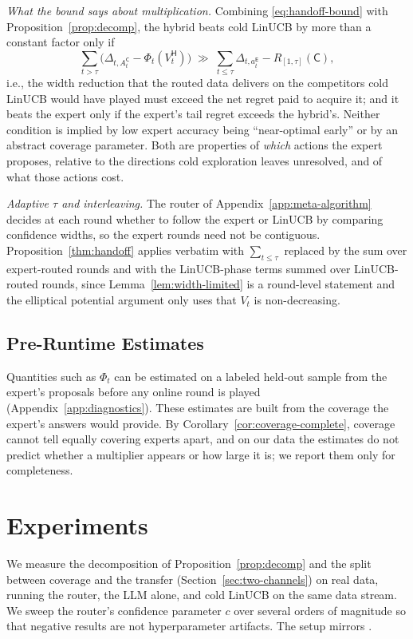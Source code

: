 \documentclass{article}
\theoremstyle{definition}
\theoremstyle{remark}
\theoremstyle{remark}
\newcommand{\Cold}{\mathsf{C}}
\newcommand{\Exp}{\mathsf{E}}
\newcommand{\Hyb}{\mathsf{H}}
\begin{document}
\emph{What the bound says about multiplication.} Combining
\eqref{eq:handoff-bound} with Proposition~\ref{prop:decomp}, the hybrid beats
cold LinUCB by more than a constant factor only if
\[
\sum_{t>\tau}\bigl(\Delta_{t,A^{\Cold}_t}-\Phi_t(V^{\Hyb}_t)\bigr)
\;\gg\;
\sum_{t\le\tau}\Delta_{t,a_t^{\Exp}}-R_{[1,\tau]}(\Cold),
\]
i.e., the width reduction that the routed data delivers on the competitors
cold LinUCB would have played must exceed the net regret paid to acquire it;
and it beats the expert only if the expert's tail regret exceeds the hybrid's.
Neither condition is implied by low expert accuracy being ``near-optimal
early'' or by an abstract coverage parameter. Both are properties of
\emph{which} actions the expert proposes, relative to the directions cold
exploration leaves unresolved, and of what those actions cost.

\emph{Adaptive $\tau$ and interleaving.} The router of
Appendix~\ref{app:meta-algorithm} decides at each round whether to follow the
expert or LinUCB by comparing confidence widths, so the expert rounds need not
be contiguous. Proposition~\ref{thm:handoff} applies verbatim with
$\sum_{t\le\tau}$ replaced by the sum over expert-routed rounds and with the
LinUCB-phase terms summed over LinUCB-routed rounds, since
Lemma~\ref{lem:width-limited} is a round-level statement and the elliptical
potential argument only uses that $V_t$ is non-decreasing.


\subsection{Pre-Runtime Estimates}
\label{sec:diagnostics}

Quantities such as $\Phi_t$ can be estimated on a labeled held-out sample from
the expert's proposals before any online round is played
(Appendix~\ref{app:diagnostics}). These estimates are built from the coverage
the expert's answers would provide. By Corollary~\ref{cor:coverage-complete},
coverage cannot tell equally covering experts apart, and on our data the
estimates do not predict whether a multiplier appears or how large it is; we
report them only for completeness.


\section{Experiments}
\label{sec:experiments}

We measure the decomposition of Proposition~\ref{prop:decomp} and the split
between coverage and the transfer (Section~\ref{sec:two-channels}) on real
data, running the router, the LLM alone, and cold LinUCB on the same data
stream. We sweep
the router's confidence parameter $c$ over several orders of magnitude so that
negative results are not hyperparameter artifacts. The setup mirrors
\cite{chen2024llmdecision}.
\end{document}
